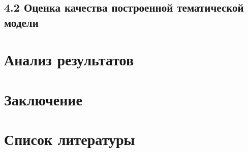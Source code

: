 \documentclass[a4paper]{report}
\begin{document}
	\subsection{4.2 Оценка качества построенной тематической модели}
	
	\section{Анализ результатов}
	
	
	
	
	
	\section{Заключение}
	
	
	
	\newpage
	\section{Список литературы}
	
\end{document}
